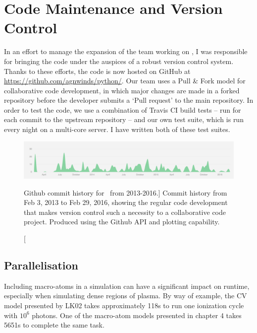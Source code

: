\section{Code Maintenance and Version Control}
\label{sec:code_maintenance}

In an effort to manage the expansion of the team working on \py, I was responsible
for bringing the code under the auspices of a robust version control system.
Thanks to these efforts, the code is now hosted on GitHub at 
\url{https://github.com/agnwinds/python/}. Our team uses a Pull \& Fork model
for collaborative code development, in which major changes are made in a 
forked repository before the developer submits a `Pull request' to the main 
repository. In order to test the code, we use a combination of Travis CI build tests 
-- run for each commit to the upstream repository -- and our own test suite, which is 
run every night on a multi-core server. I have written both of these test suites.

\begin{figure}
\centering
\includegraphics[width=1.0\textwidth]{figures/03-radtrans/github1.png}
\caption
[Github commit history for \py\ from 2013-2016.]
{
Commit history from Feb 3, 2013 to Feb 29, 2016, showing the regular code development
that makes version control such a necessity to a collaborative code project. Produced
using the Github API and plotting capability.
} 
\label{fig:github}
\end{figure}

\subsection{Parallelisation} 
\label{sec:parallel}

Including macro-atoms in a simulation can have a significant impact 
on runtime, especially when simulating dense regions of plasma. 
By way of example, the CV model presented by LK02 takes approximately
118s to run one ionization cycle with $10^6$ photons. One of the macro-atom 
models presented in chapter 4 takes 5651s to complete the same task. 

